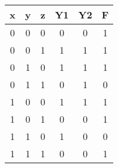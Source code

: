 \begin{tabular}{ |c |c |c |c |c |c |}  
\hline 
\newline  
 \textbf{x} & \textbf{y} & \textbf{z} & \textbf{Y1} & \textbf{Y2} & \textbf{F}\\
 \hline
 0 & 0 & 0 &0 &0 &1 \\
 \hline
 0 & 0 & 1 &1 &1 &1 \\
 \hline
 0 & 1 & 0 &1 &1 &1 \\
 \hline
 0 & 1 & 1 &0 &1 &0 \\
 \hline
 1 & 0 & 0 &1 &1 &1 \\
 \hline
 1 & 0 & 1 &0 &0 &1 \\
 \hline
 1 & 1 & 0 &1 &0 &0 \\
 \hline
 1 & 1 & 1 &0 &0 &1 \\
 \hline
 \end{tabular}
